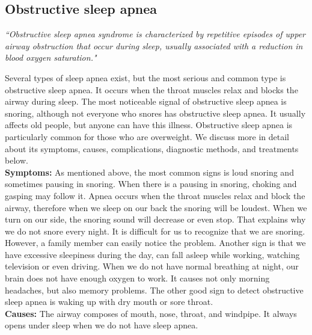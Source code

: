 \subsection{Obstructive sleep apnea}
    \textit{``Obstructive sleep apnea syndrome is characterized by repetitive episodes of upper airway obstruction that occur during sleep, usually associated with a reduction in blood oxygen saturation."}\cite{Westchester}
    
    Several types of sleep apnea exist, but the most serious and common type is obstructive sleep apnea. It occurs when the throat muscles relax and blocks the airway during sleep. The most noticeable signal of obstructive sleep apnea is snoring, although not everyone who snores has obstructive sleep apnea. It usually affects old people, but anyone can have this illness. Obstructive sleep apnea is particularly common for those who are overweight. We discuss more in detail about its symptoms, causes, complications, diagnostic methods, and treatments below.\\
    \textbf{Symptoms:} As mentioned above, the most common signs is loud snoring and sometimes pausing in snoring. When there is a pausing in snoring, choking and gasping may follow it. Apnea occurs when the throat muscles relax and block the airway, therefore when we sleep on our back the snoring will be loudest. When we turn on our side, the snoring sound will decrease or even stop. That explains why we do not snore every night. It is difficult for us to recognize that we are snoring. However, a family member can easily notice the problem. Another sign is that we have excessive sleepiness during the day, can fall asleep while working, watching television or even driving. When we do not have normal breathing at night, our brain does not have enough oxygen to work. It causes not only morning headaches, but also memory problems. The other good sign to detect obstructive sleep apnea is waking up with dry mouth or sore throat.\\
    \textbf{Causes:}
    The airway composes of mouth, nose, throat, and windpipe. It always opens under sleep when we do not have sleep apnea. 


